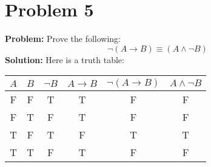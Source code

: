\documentclass{article}
\begin{document}
\section*{Problem 5}
\textbf{Problem:} Prove the following:
$$\neg(A\rightarrow B)\equiv(A \wedge\neg B)$$
\textbf{Solution:} Here is a truth table:
\begin{center}
\begin{tabular}{cccccc}
$A$ & $B$ & $\neg B$ & $A\rightarrow B$ & $\neg(A\rightarrow B)$ & $A \wedge\neg B$\\
\midrule
\hline
F&F&T&T&F&F\\
F&T&F&T&F&F\\
T&F&T&F&T&T\\
T&T&F&T&F&F\\
\end{tabular}
\end{center}
\end{document}
